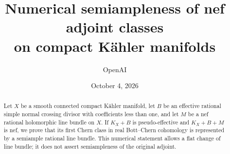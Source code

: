 \documentclass[11pt]{article}
\title{Numerical semiampleness of nef adjoint classes\\on compact K\"ahler manifolds}
\author{OpenAI}
\date{October 4, 2026}
\begin{document}
\maketitle
\begin{abstract}
Let \(X\) be a smooth connected compact K\"ahler manifold, let \(B\) be an
effective rational simple normal crossing divisor with coefficients less
than one, and let \(M\) be a nef rational holomorphic line bundle on \(X\).
If \(K_X+B\) is pseudo-effective and \(K_X+B+M\) is nef, we prove that its
first Chern class in real Bott--Chern cohomology is represented by a semiample
rational line bundle. This numerical statement allows a flat change of line
bundle; it does not assert semiampleness of the original adjoint.
\end{abstract}
\tableofcontents







\begingroup
\raggedright


\endgroup
\end{document}
